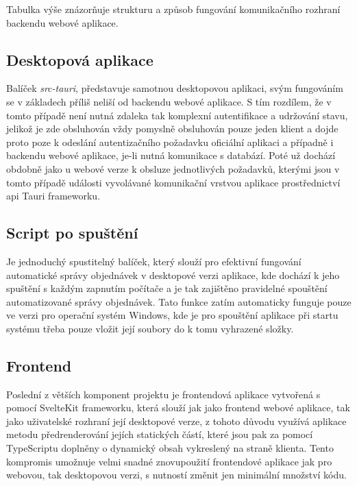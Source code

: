 \documentclass[12pt]{article}
\begin{document}
Tabulka výše znázorňuje strukturu a způsob fungování komunikačního rozhraní backendu webové aplikace.

\subsection{Desktopová aplikace}
Balíček \textit{src-tauri}, představuje samotnou desktopovou aplikaci, svým fungováním se v základech příliš neliší od backendu webové aplikace. S tím rozdílem, že v tomto případě není nutná zdaleka tak komplexní autentifikace a udržování stavu, jelikož je zde obsluhován vždy pomyslně obsluhován pouze jeden klient a dojde proto poze k odeslání autentizačního požadavku oficiální aplikaci a případně i backendu webové aplikace, je-li nutná komunikace s databází. Poté už dochází obdobně jako u webové verze k obsluze jednotlivých požadavků, kterými jsou v tomto případě události vyvolávané komunikační vrstvou aplikace prostřednictví api Tauri frameworku\cite{invoke}. 

\subsection{Script po spuštění}
Je jednoduchý spustitelný balíček, který slouží pro efektivní fungování automatické správy objednávek v desktopové verzi aplikace, kde dochází k jeho spuštění s každým zapnutím počítače a je tak zajištěno pravidelné spouštění automatizované správy objednávek. Tato funkce zatím automaticky funguje pouze ve verzi pro operační systém Windows, kde je pro spouštění aplikace při startu systému třeba pouze vložit její soubory do k tomu vyhrazené složky\cite{startup}.

\subsection{Frontend}
Poslední z větších komponent projektu je frontendová aplikace vytvořená s pomocí SvelteKit frameworku, která slouží jak jako frontend webové aplikace, tak jako uživatelské rozhraní její desktopové verze, z tohoto důvodu využívá aplikace metodu předrenderování jejích statických částí, které jsou pak za pomocí TypeScriptu doplněny o dynamický obsah vykreslený na straně klienta. Tento kompromis umožnuje velmi snadné znovupoužití frontendové aplikace jak pro webovou, tak desktopovou verzi, s nutností změnit jen minimální množství kódu.
\end{document}

